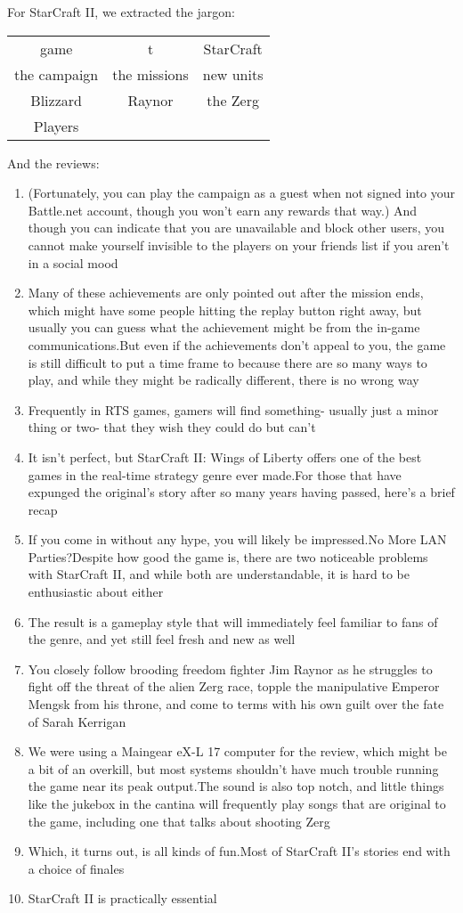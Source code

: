\documentclass{article}
\begin{document}
For StarCraft II, we extracted the jargon:
\begin{center}\begin{tabular}{ccc}
	game&t&StarCraft\\
	the campaign&the missions&new units\\
	Blizzard&Raynor&the Zerg\\
	Players&&
\end{tabular}
\end{center}
And the reviews:
\begin{enumerate}
\item (Fortunately, you can play the campaign as a guest when not signed into your Battle.net account, though you won't earn any rewards that way.) And though you can indicate that you are unavailable and block other users, you cannot make yourself invisible to the players on your friends list if you aren't in a social mood
\item Many of these achievements are only pointed out after the mission ends, which might have some people hitting the replay button right away, but usually you can guess what the achievement might be from the in-game communications.But even if the achievements don't appeal to you, the game is still difficult to put a time frame to because there are so many ways to play, and while they might be radically different, there is no wrong way
\item Frequently in RTS games, gamers will find something- usually just a minor thing or two- that they wish they could do but can't
\item It isn't perfect, but StarCraft II: Wings of Liberty offers one of the best games in the real-time strategy genre ever made.For those that have expunged the original's story after so many years having passed, here's a brief recap
\item If you come in without any hype, you will likely be impressed.No More LAN Parties?Despite how good the game is, there are two noticeable problems with StarCraft II, and while both are understandable, it is hard to be enthusiastic about either
\item The result is a gameplay style that will immediately feel familiar to fans of the genre, and yet still feel fresh and new as well
\item You closely follow brooding freedom fighter Jim Raynor as he struggles to fight off the threat of the alien Zerg race, topple the manipulative Emperor Mengsk from his throne, and come to terms with his own guilt over the fate of Sarah Kerrigan
\item We were using a Maingear eX-L 17 computer for the review, which might be a bit of an overkill, but most systems shouldn't have much trouble running the game near its peak output.The sound is also top notch, and little things like the jukebox in the cantina will frequently play songs that are original to the game, including one that talks about shooting Zerg
\item Which, it turns out, is all kinds of fun.Most of StarCraft II's stories end with a choice of finales
\item StarCraft II is practically essential
\end{enumerate}
\end{document}
